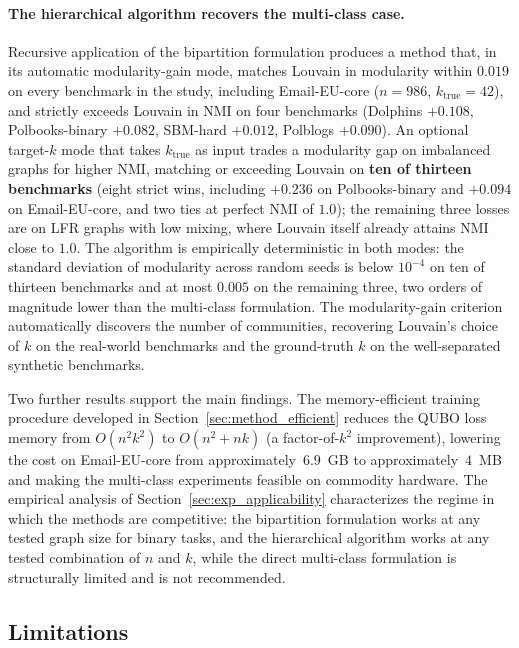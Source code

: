 \paragraph{The hierarchical algorithm recovers the multi-class
case.} Recursive application of the bipartition formulation
produces a method that, in its automatic modularity-gain mode,
matches Louvain in modularity within $0.019$ on every benchmark
in the study, including Email-EU-core ($n = 986$,
$k_{\mathrm{true}} = 42$), and strictly exceeds Louvain in NMI
on four benchmarks (Dolphins $+0.108$, Polbooks-binary $+0.082$,
SBM-hard $+0.012$, Polblogs $+0.090$). An optional target-$k$
mode that takes $k_{\mathrm{true}}$ as input trades a modularity
gap on imbalanced graphs for higher NMI, matching or exceeding
Louvain on \textbf{ten of thirteen benchmarks} (eight strict
wins, including $+0.236$ on Polbooks-binary and $+0.094$ on
Email-EU-core, and two ties at perfect NMI of $1.0$); the
remaining three losses are on LFR graphs with low mixing, where
Louvain itself already attains NMI close to $1.0$. The algorithm
is empirically deterministic in both modes: the standard
deviation of modularity across random seeds is below $10^{-4}$
on ten of thirteen benchmarks and at most $0.005$ on the
remaining three, two orders of magnitude lower than the
multi-class formulation. The modularity-gain criterion
automatically discovers the number of communities, recovering
Louvain's choice of $k$ on the real-world benchmarks and the
ground-truth $k$ on the well-separated synthetic benchmarks.

\medskip

Two further results support the main findings. The
memory-efficient training procedure developed in
Section~\ref{sec:method_efficient} reduces the QUBO loss memory
from $O(n^2 k^2)$ to $O(n^2 + nk)$ (a factor-of-$k^2$
improvement), lowering the cost on Email-EU-core from
approximately~$6.9$~GB to approximately~$4$~MB and making the
multi-class experiments feasible on commodity hardware. The empirical analysis of Section~\ref{sec:exp_applicability}
characterizes the regime in which the methods are competitive:
the bipartition formulation works at any tested graph size for
binary tasks, and the hierarchical algorithm works at any tested
combination of $n$ and $k$, while the direct multi-class
formulation is structurally limited and is not recommended.


\subsection{Limitations}
\label{sec:limitations}

